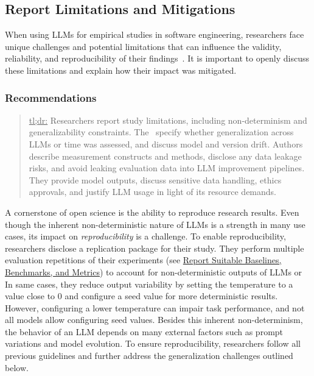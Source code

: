 



\subsection{Report Limitations and Mitigations}

When using LLMs for empirical studies in software engineering, researchers face unique challenges and potential limitations that can influence the validity, reliability, and reproducibility of their findings~\cite{sallou2024breaking}.
It is important to openly discuss these limitations and explain how their impact was mitigated.

\subsubsection{Recommendations}

\begin{quote}
\underline{tl;dr:} Researchers \must report study limitations, including non-determinism and generalizability constraints. The \paper~\must specify whether generalization across LLMs or time was assessed, and discuss model and version drift. Authors \must describe measurement constructs and methods, disclose any data leakage risks, and avoid leaking evaluation data into LLM improvement pipelines. They \must provide model outputs, discuss sensitive data handling, ethics approvals, and justify LLM usage in light of its resource demands.
\end{quote}


A cornerstone of open science is the ability to reproduce research results.
Even though the inherent non-deterministic nature of LLMs is a strength in many use cases, its impact on \emph{reproducibility} is a challenge. To enable reproducibility, researchers \should disclose a replication package for their study.
They \should perform multiple evaluation repetitions of their experiments (see \href{/guidelines/report-baselines-benchmarks-and-metrics}{Report Suitable Baselines, Benchmarks, and Metrics}) to account for non-deterministic outputs of LLMs or
In same cases, they \may reduce output variability by setting the temperature to a value close to 0 and configure a seed value for more deterministic results.
However, configuring a lower temperature can impair task performance, and not all models allow configuring seed values.
Besides this inherent non-determinism, the behavior of an LLM depends on many external factors such as prompt variations and model evolution.
To ensure reproducibility, researchers \should follow all previous guidelines and further address the generalization challenges outlined below.


